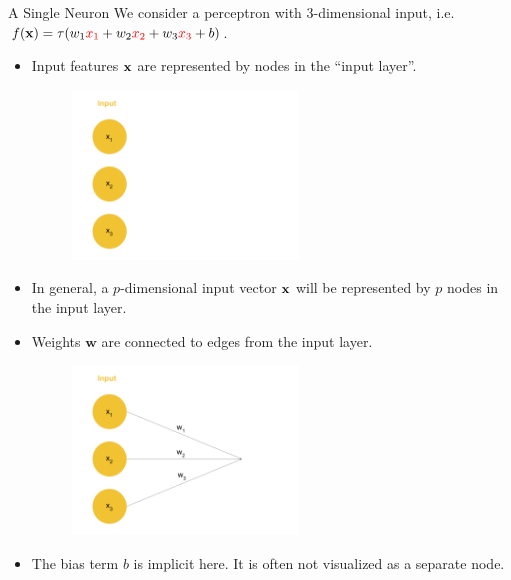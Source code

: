 \documentclass[11pt,compress,t,notes=noshow, xcolor=table]{beamer}
\begin{document}
\begin{vbframe} {A Single Neuron}
We consider a %
 perceptron with
$3$-dimensional input, i.e. $f(\mathbf{x}) = \tau(w_1\textcolor{red}{x_1} + w_2\textcolor{red}{x_2} + w_3\textcolor{red}{x_3} + b)$.
\begin{itemize}
\item %
Input features $\mathbf{x}$ are represented by nodes in the \enquote{input layer}.
\begin{figure}
\includegraphics[width=6cm]{figure/neurep_one.png}
\end{figure}
\item In general, a $p$-dimensional input vector $\mathbf{x}$ will be represented by $p$ nodes in the input layer.
\framebreak

\item %
Weights $\mathbf{w}$ are connected to edges from the input layer.
\begin{figure}
\includegraphics[width=6cm]{figure/neurep_two.png}
\end{figure}
\item The bias term $b$ is implicit here. It is often not visualized as a separate node.
\end{itemize}
\framebreak


\end{vbframe}
\end{document}
